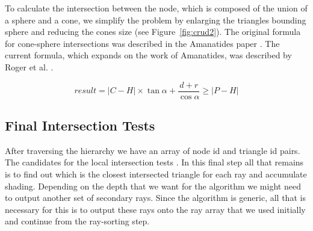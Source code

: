 To calculate the intersection between the node, which is composed of the union of a sphere and a cone, we simplify the problem by enlarging the triangles bounding sphere \cite{Ericson04} and reducing the cones size (see Figure~\ref{fig:crud2}). The original formula for cone-sphere intersections was described in the Amanatides paper \cite{Amanatides84}. The current formula, which expands on the work of Amanatides, was described by Roger et al. \cite{Roger07}.

\begin{equation}
result = {|C - H|} \times \tan{\alpha} + \frac{d+r}{\cos{\alpha}} \geqslant
         {|P - H|}
\end{equation}

\subsection{Final Intersection Tests}

After traversing the hierarchy we have an array of node id and triangle id pairs. The candidates for the local intersection tests \cite{Moller97}. In this final step all that remains is to find out which is the closest intersected triangle for each ray and accumulate shading. Depending on the depth that we want for the algorithm we might need to output another set of secondary rays. Since the algorithm is generic, all that is necessary for this is to output these rays onto the ray array that we used initially and continue from the ray-sorting step.
